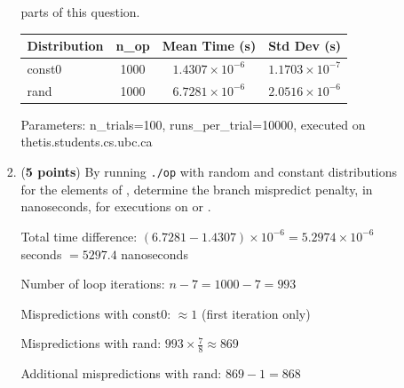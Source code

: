 \documentclass{article}
\newenvironment{answer}
{\par\color{blue}}
{\normalfont\par}
\begin{document}
\begin{enumerate}
\begin{enumerate}
\begin{enumerate}
                              parts of this question.
                              \begin{answer}
                                  \begin{center}
                                      \begin{tabular}{|l|c|c|c|}
                                          \hline
                                          \textbf{Distribution} & \textbf{n\_op} & \textbf{Mean Time (s)}  & \textbf{Std Dev (s)}    \\
                                          \hline
                                          const0                & 1000           & $1.4307 \times 10^{-6}$ & $1.1703 \times 10^{-7}$ \\
                                          \hline
                                          rand                  & 1000           & $6.7281 \times 10^{-6}$ & $2.0516 \times 10^{-6}$ \\
                                          \hline
                                      \end{tabular}
                                  \end{center}

                                  Parameters: n\_trials=100, runs\_per\_trial=10000, executed on thetis.students.cs.ubc.ca
                              \end{answer}
                        \item (\textbf{5 points}) By running \texttt{./op} with random and constant distributions for the elements
                              of , determine the branch mispredict penalty, in nanoseconds,
                              for executions on  or .
                              \begin{answer}
                                  Total time difference: $(6.7281 - 1.4307) \times 10^{-6} = 5.2974 \times 10^{-6}$ seconds $= 5297.4$ nanoseconds

                                  Number of loop iterations: $n - 7 = 1000 - 7 = 993$

                                  Mispredictions with const0: $\approx 1$ (first iteration only)

                                  Mispredictions with rand: $993 \times \frac{7}{8} \approx 869$

                                  Additional mispredictions with rand: $869 - 1 = 868$


\end{answer}
\end{enumerate}
\end{enumerate}
\end{enumerate}
\end{document}
